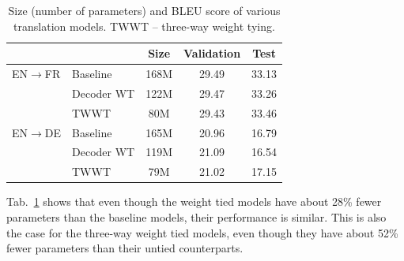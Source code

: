 \documentclass[11pt]{article}
\begin{document}
%


\begin{table}[t]
\begin{small}
\begin{center}
\begin{tabular}{ll|ccc}
\hline
      &          & Size & Validation & Test  \\ \hline
EN$\rightarrow$FR & Baseline & 168M  & 29.49 & 33.13     \\ 
                  & Decoder WT        & 122M  & 29.47 & 33.26   \\ 
                  & TWWT     & 80M   & 29.43 & 33.46 \\ \hline

EN$\rightarrow$DE & Baseline & 165M  & 20.96 & 16.79    \\ 
                  & Decoder WT       & 119M  & 21.09 & 16.54   \\ 
                  & TWWT     & 79M   & 21.02 & 17.15 \\ \hline
\end{tabular}
\end{center}
\end{small}
\caption{\small Size (number of parameters) and BLEU score of various translation models. TWWT -- three-way weight tying.}

\label{tab:translation}
\end{table}



Tab.~\ref{tab:translation} shows that even though the weight tied models have about 28\% fewer parameters than the baseline models, their performance is similar. This is also the case for the three-way weight tied models, even though they have about 52\% fewer parameters than their untied counterparts. 





\end{document}
